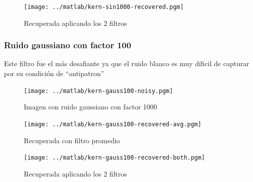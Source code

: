\begin{figure}[H]
\begin {center}
\texttt{[image: ../matlab/kern-sin1000-recovered.pgm]}
\end {center}
\caption{Recuperada aplicando los 2 filtros}
\label{fig:SinProm}
\end{figure}


\subsubsection{Ruido gaussiano con factor 100}

Este filtro fue el m\'as desafiante ya que el ruido blanco es muy d\'ificil de
capturar por su condici\'on de ``antipatron''

\begin{figure}[H]
\begin {center}
\texttt{[image: ../matlab/kern-gauss100-noisy.pgm]}
\end {center}
\caption{Imagen con ruido gaussiano con factor 1000}
\label{fig:SinProm}
\end{figure}

\begin{figure}[H]
\begin {center}
\texttt{[image: ../matlab/kern-gauss100-recovered-avg.pgm]}
\end {center}
\caption{Recuperada con filtro promedio}
\label{fig:SinProm}
\end{figure}

\begin{figure}[H]
\begin {center}
\texttt{[image: ../matlab/kern-gauss100-recovered-both.pgm]}
\end {center}
\caption{Recuperada aplicando los 2 filtros}
\label{fig:SinProm}
\end{figure}
